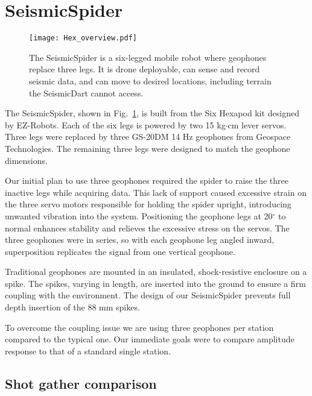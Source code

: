 \section{SeismicSpider}\label{sec:SeismicSpider}


\begin{figure} \centering
  {\texttt{[image: Hex\_overview.pdf]}}
 \caption{The SeismicSpider is a six-legged mobile robot where geophones replace three legs. It is drone deployable, can sense and record seismic data, and can move to desired locations, including terrain the SeismicDart cannot access.} 
 \label{fig:Hex_overview}
\end{figure}


The SeismicSpider, shown in Fig.~\ref{fig:Hex_overview}, is built from the Six Hexapod kit designed by EZ-Robots. Each of the six legs is powered by two 15 kg$\cdot$cm lever servos. Three legs were replaced by three GS-20DM 14 Hz geophones from Geospace Technologies. The remaining three legs were designed to match the geophone dimensions.

 Our initial plan to use three geophones required the spider to raise the three inactive legs while acquiring data. This lack of support caused excessive strain on the three servo motors responsible for holding the spider upright, introducing unwanted vibration into the system.  Positioning the geophone legs at 20$^\circ$ to normal enhances stability and relieves the excessive stress on the servos. 
 The three geophones were in series, so with each geophone leg angled inward, superposition replicates the signal from one vertical geophone.
 
 Traditional geophones are mounted in an insulated, shock-resistive enclosure on a spike. The spikes, varying in length, are inserted into the ground to ensure a firm coupling with the environment. The design of our SeismicSpider prevents full depth insertion of the 88 mm spikes. 

	To overcome the coupling issue we are using three geophones per station compared to the typical one. Our immediate goals were to compare amplitude response to that of a standard single station.	
 

\subsection{Shot gather comparison}

